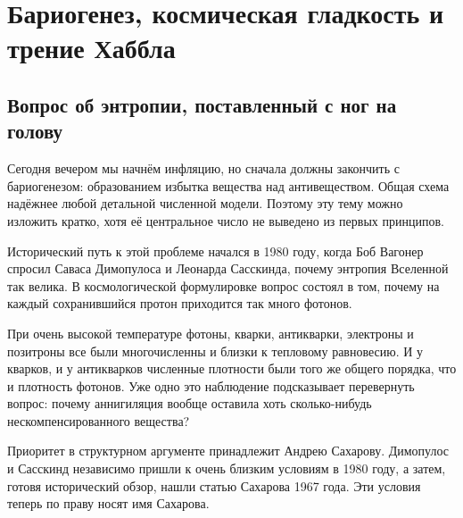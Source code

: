 \chapter{Бариогенез, космическая гладкость и трение Хаббла}


\section{Вопрос об энтропии, поставленный с ног на голову}

Сегодня вечером мы начнём инфляцию, но сначала должны закончить с бариогенезом: образованием избытка вещества над антивеществом. Общая схема надёжнее любой детальной численной модели. Поэтому эту тему можно изложить кратко, хотя её центральное число не выведено из первых принципов.

Исторический путь к этой проблеме начался в 1980 году, когда Боб Вагонер спросил Саваса Димопулоса и Леонарда Сасскинда, почему энтропия Вселенной так велика. В космологической формулировке вопрос состоял в том, почему на каждый сохранившийся протон приходится так много фотонов.

При очень высокой температуре фотоны, кварки, антикварки, электроны и позитроны все были многочисленны и близки к тепловому равновесию. И у кварков, и у антикварков численные плотности были того же общего порядка, что и плотность фотонов. Уже одно это наблюдение подсказывает перевернуть вопрос: почему аннигиляция вообще оставила хоть сколько-нибудь нескомпенсированного вещества?

Приоритет в структурном аргументе принадлежит Андрею Сахарову. Димопулос и Сасскинд независимо пришли к очень близким условиям в 1980 году, а затем, готовя исторический обзор, нашли статью Сахарова 1967 года. Эти условия теперь по праву носят имя Сахарова.

